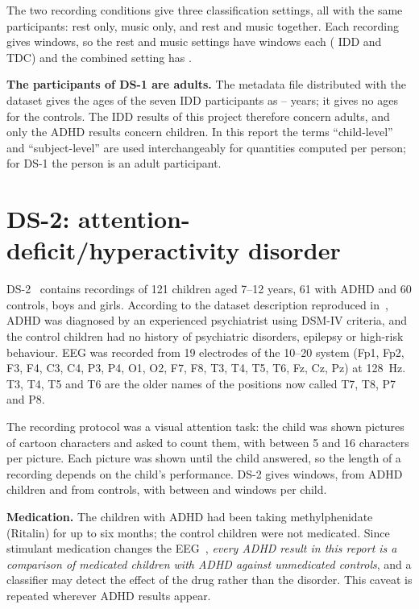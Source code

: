 The two recording conditions give three classification settings, all with the same
participants: rest only, music only, and rest and music together. Each recording gives
 windows, so the rest and music settings have 
windows each ( IDD and  TDC) and the combined setting
has .

\textbf{The participants of DS-1 are adults.} The metadata file distributed with the dataset
gives the ages of the seven IDD participants as -- years; it
gives no ages for the controls. The IDD results of this project therefore concern adults, and
only the ADHD results concern children. In this report the terms ``child-level'' and
``subject-level'' are used interchangeably for quantities computed per person; for DS-1 the
person is an adult participant.

\section{DS-2: attention-deficit/hyperactivity disorder}
DS-2~\cite{motie2020} contains recordings of 121 children aged 7--12 years, 61 with ADHD and 60
controls, boys and girls. According to the dataset description reproduced
in~\cite{chandela2025}, ADHD was diagnosed by an experienced psychiatrist using DSM-IV criteria,
and the control children had no history of psychiatric disorders, epilepsy or high-risk
behaviour. EEG was recorded from 19 electrodes of the 10--20 system (Fp1, Fp2, F3, F4, C3, C4,
P3, P4, O1, O2, F7, F8, T3, T4, T5, T6, Fz, Cz, Pz) at 128~Hz. T3, T4, T5 and T6 are the older
names of the positions now called T7, T8, P7 and P8.

The recording protocol was a visual attention task: the child was shown pictures of cartoon
characters and asked to count them, with between 5 and 16 characters per picture. Each picture
was shown until the child answered, so the length of a recording depends on the child's
performance. DS-2 gives  windows,  from ADHD children and
 from controls, with between  and 
windows per child.

\textbf{Medication.} The children with ADHD had been taking methylphenidate (Ritalin) for up to
six months; the control children were not medicated. Since stimulant medication changes the
EEG~\cite{clarke2002}, \emph{every ADHD result in this report is a comparison of medicated
children with ADHD against unmedicated controls}, and a classifier may detect the effect of the
drug rather than the disorder. This caveat is repeated wherever ADHD results appear.

